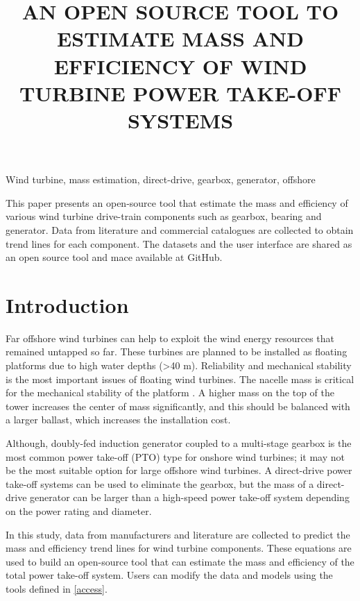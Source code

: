\documentclass{article}\usepackage{graphicx, color}
\begin{document}
\title{AN OPEN SOURCE TOOL TO ESTIMATE MASS AND EFFICIENCY OF WIND TURBINE POWER TAKE-OFF SYSTEMS}


\maketitle

\keywords
Wind turbine, mass estimation, direct-drive, gearbox, generator, offshore

\abstract

This paper presents an open-source tool that estimate the mass and efficiency of various wind turbine drive-train components such as gearbox, bearing and generator. Data from literature and commercial catalogues are collected to obtain trend lines for each component. The datasets and the user interface are shared as an open source tool and mace available at GitHub.

\section{Introduction}

Far offshore wind turbines can help to exploit the wind energy resources that remained untapped so far. These turbines are planned to be installed as floating platforms due to  high water depths (\textgreater 40 m). Reliability and mechanical stability is the most important issues of floating wind turbines. The nacelle mass is critical for the mechanical stability of the platform \cite{Christiansen2011, Sethuraman2013}. A higher mass on the top of the tower increases the center of mass significantly, and this should be balanced with a larger ballast, which increases the installation cost. 

Although, doubly-fed induction generator coupled to a multi-stage gearbox is the most common power take-off (PTO) type for onshore wind turbines; it may not be the most suitable option for large offshore wind turbines. A direct-drive power take-off systems can be used to eliminate the gearbox, but the mass of a direct-drive generator can be larger than a high-speed power take-off system depending on the power rating and diameter.

In this study, data from manufacturers and literature are collected to predict the  mass and efficiency trend lines for wind turbine components. These equations are used to build an open-source tool that can estimate the mass and efficiency of the total power take-off system. Users can modify the data and models using the tools defined in \autoref{access}.
\end{document}
